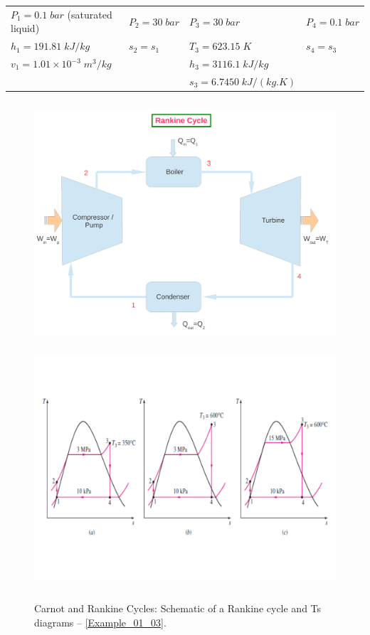 \documentclass[12pts,a4paper,amsmath,amssymb,floatfix]{article}%
\begin{document}
\begin{enumerate}[label=\bfseries Example \arabic*]
\begin{enumerate}
\begin{tabular}{l l l l}
$P_{1}=0.1\;bar$ (saturated liquid) &  $P_{2}=30\;bar$ & $P_{3}=30\;bar$           & $P_{4}=0.1\;bar$ \\
$h_{1}=191.81\;kJ/kg$               &  $s_{2}=s_{1}$   & $T_{3}=623.15\;K$         & $s_{4}=s_{3}$ \\
$v_{1}=1.01\times 10^{-3}\;m^{3}/kg$ &                  & $h_{3}=3116.1\;kJ/kg$     &                 \\
                                    &                 & $s_{3}=6.7450\;kJ/(kg.K)$ &                 \\
\end{tabular}


\begin{figure}[h]
\begin{center}
\vbox{
\includegraphics[width=13.0cm,height=9.0cm]{./Pics/Simple_Rankine_Cycle_2}
\vspace{-1.cm}
\includegraphics[width=15.0cm,height=9.0cm]{./Pics/example01_03}
}
\end{center}
\caption{Carnot and Rankine Cycles: Schematic of a Rankine cycle and Ts diagrams -- \ref{Example_01_03}.}
\label{Example01_01:Pic3}
\end{figure}


\end{enumerate}
\end{enumerate}
\end{document}
